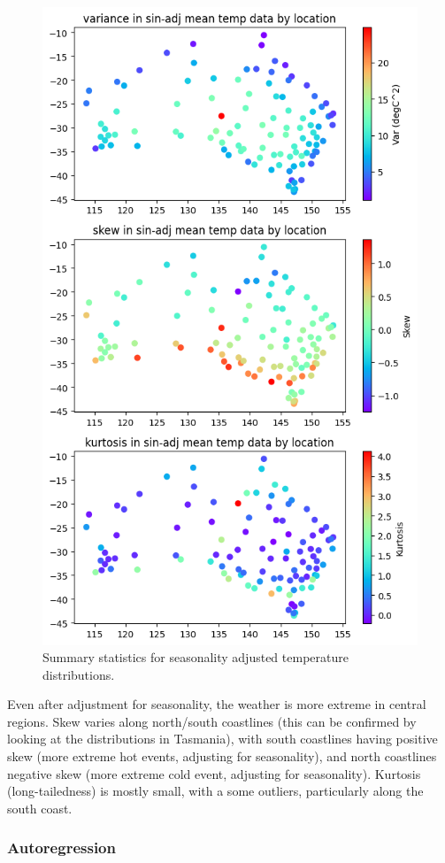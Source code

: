 \documentclass[12pt,a4paper]{article} %
\begin{document}
\begin{figure}[!ht]
    \centering
    \includegraphics[width=0.6\linewidth]{mean_dists_by_loc.png}
    \caption{Summary statistics for seasonality adjusted temperature distributions.}
    \label{fig:dists_by_loc}
\end{figure}

Even after adjustment for seasonality, the weather is more extreme in central regions. Skew varies along north/south coastlines (this can be confirmed by looking at the distributions in Tasmania), with south coastlines having positive skew (more extreme hot events, adjusting for seasonality), and north coastlines negative skew (more extreme cold event, adjusting for seasonality). Kurtosis (long-tailedness) is mostly small, with a some outliers, particularly along the south coast.\\

\subsubsection{Autoregression}
\label{subsec:autoregression}
\end{document}
